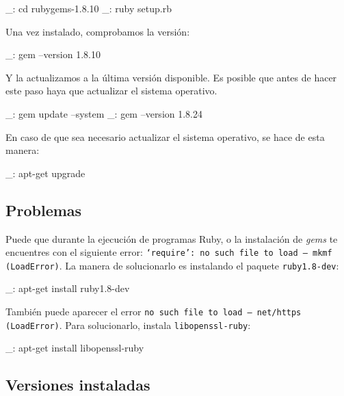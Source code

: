 \begin{bashcode}
_: cd rubygems-1.8.10
_: ruby setup.rb
\end{bashcode}

Una vez instalado, comprobamos la versión:

\begin{bashcode}
_: gem --version
1.8.10
\end{bashcode}

Y la actualizamos a la última versión disponible. Es posible que antes de hacer este paso haya que actualizar el sistema operativo.

\begin{bashcode}
_: gem update --system
_: gem --version
1.8.24
\end{bashcode}

En caso de que sea necesario actualizar el sistema operativo, se hace de esta manera:

\begin{bashcode}
_: apt-get upgrade
\end{bashcode}


\subsection{Problemas}

Puede que durante la ejecución de programas Ruby, o la instalación de \emph{gems} te encuentres con el siguiente error: \texttt{`require': no such file to load -- mkmf (LoadError)}. La manera de solucionarlo es instalando el paquete \texttt{ruby1.8-dev}:

\begin{bashcode}
_: apt-get install ruby1.8-dev
\end{bashcode}

También puede aparecer el error \texttt{no such file to load -- net/https (LoadError)}. Para solucionarlo, instala \texttt{libopenssl-ruby}:

\begin{bashcode}
_: apt-get install libopenssl-ruby
\end{bashcode}


\pagebreak
\subsection{Versiones instaladas}

